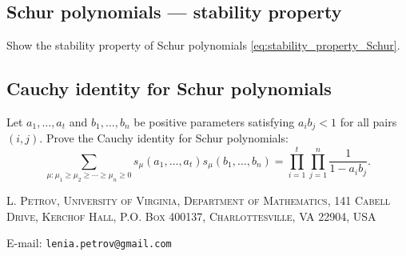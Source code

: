 \documentclass[letterpaper,11pt,oneside,reqno]{article}
\numberwithin{equation}{section}
\theoremstyle{definition}
\begin{document}
\subsection{Schur polynomials --- stability property}

Show the stability property of Schur polynomials \eqref{eq:stability_property_Schur}.


\subsection{Cauchy identity for Schur polynomials}
\label{prob:Cauchy_identity}

Let $a_1, \ldots, a_t$ and $b_1, \ldots, b_n$ be positive parameters satisfying $a_i b_j < 1$ for all pairs $(i,j)$. Prove the Cauchy identity for Schur polynomials:
\begin{equation*}
	\sum_{\mu: \mu_1 \geq \mu_2 \geq \cdots \geq \mu_n \geq 0} s_\mu(a_1,\ldots,a_t)s_\mu(b_1,\ldots,b_n) = \prod_{i=1}^t\prod_{j=1}^n \frac{1}{1-a_i b_j}.
\end{equation*}
















\medskip

\textsc{L. Petrov, University of Virginia, Department of Mathematics, 141 Cabell Drive, Kerchof Hall, P.O. Box 400137, Charlottesville, VA 22904, USA}

E-mail: \texttt{lenia.petrov@gmail.com}
\end{document}
